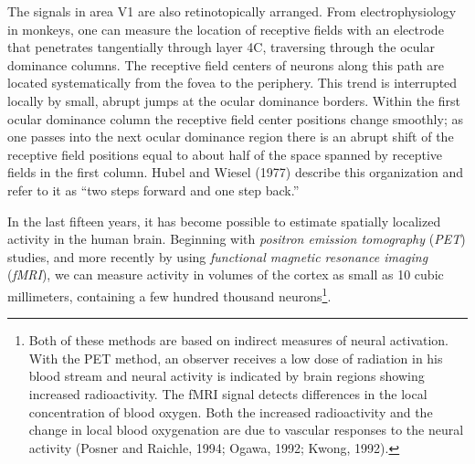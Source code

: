The signals in area V1 are also
retinotopically arranged.
From electrophysiology in monkeys,
one can measure the location of receptive fields with an electrode that
penetrates tangentially through layer 4C, traversing through the
ocular dominance columns.  The receptive field centers of neurons
along this path are located
systematically from the fovea to the periphery.
This trend is interrupted locally by small, abrupt jumps at the ocular
dominance borders.  Within the first ocular dominance column the
receptive field center positions change smoothly; as one passes into
the next ocular dominance region there is an abrupt shift of the
receptive field positions equal to about half of the space spanned by
receptive fields in the first column.  Hubel and Wiesel (1977)
describe this organization and refer to it as ``two steps forward and
one step back.''

In the last fifteen years, it has become possible to estimate
spatially localized activity in the human brain.  Beginning with {\em
positron emission tomography} ({\em PET}) studies, and more recently
by using {\em functional magnetic resonance imaging} ({\em fMRI}), we
can measure activity in volumes of the cortex as small as 10 cubic
millimeters, containing a few hundred thousand neurons\footnote{Both
of these methods are based on indirect measures of neural activation.
With the PET method, an observer receives a low dose of radiation in
his blood stream and neural activity is indicated by brain regions
showing increased radioactivity.  The fMRI signal detects differences
in the local concentration of blood oxygen.  Both the increased
radioactivity and the change in local blood oxygenation are due to
vascular responses to the neural activity (Posner and Raichle, 1994;
Ogawa, 1992; Kwong, 1992).}.

